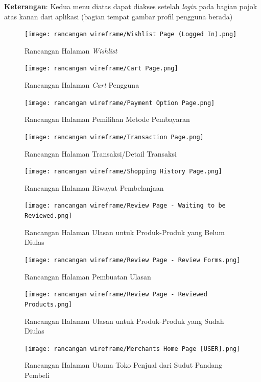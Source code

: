 \documentclass[a4paper]{article}
\begin{document}
\begin{enumerate}
    \textbf{Keterangan}: Kedua menu diatas dapat diakses setelah \textit{login} pada bagian pojok atas kanan dari aplikasi (bagian tempat gambar profil pengguna berada)
    \newpage
    \begin{figure}[h]
        \centering
        \texttt{[image: rancangan wireframe/Wishlist Page (Logged In).png]}
        \caption{Rancangan Halaman \textit{Wishlist}}
    \end{figure}

    \begin{figure}[h]
        \centering
        \texttt{[image: rancangan wireframe/Cart Page.png]}
        \caption{Rancangan Halaman \textit{Cart} Pengguna}
    \end{figure}
    \newpage
    \begin{figure}[h]
        \centering
        \texttt{[image: rancangan wireframe/Payment Option Page.png]}
        \caption{Rancangan Halaman Pemilihan Metode Pembayaran}
    \end{figure}

    \begin{figure}[h]
        \centering
        \texttt{[image: rancangan wireframe/Transaction Page.png]}
        \caption{Rancangan Halaman Transaksi/Detail Transaksi}
    \end{figure}
    \newpage
    \begin{figure}[h]
        \centering
        \texttt{[image: rancangan wireframe/Shopping History Page.png]}
        \caption{Rancangan Halaman Riwayat Pembelanjaan}
    \end{figure}

    \begin{figure}[h]
        \centering
        \texttt{[image: rancangan wireframe/Review Page - Waiting to be Reviewed.png]}
        \caption{Rancangan Halaman Ulasan untuk Produk-Produk yang Belum Diulas}
    \end{figure}
    \newpage
    \begin{figure}[h]
        \centering
        \texttt{[image: rancangan wireframe/Review Page - Review Forms.png]}
        \caption{Rancangan Halaman Pembuatan Ulasan}
    \end{figure}

    \begin{figure}[h]
        \centering
        \texttt{[image: rancangan wireframe/Review Page - Reviewed Products.png]}
        \caption{Rancangan Halaman Ulasan untuk Produk-Produk yang Sudah Diulas}
    \end{figure}
    \newpage
    \begin{figure}[h]
        \centering
        \texttt{[image: rancangan wireframe/Merchants Home Page [USER].png]}
        \caption{Rancangan Halaman Utama Toko Penjual dari Sudut Pandang Pembeli}
    \end{figure}


\end{enumerate}
\end{document}
